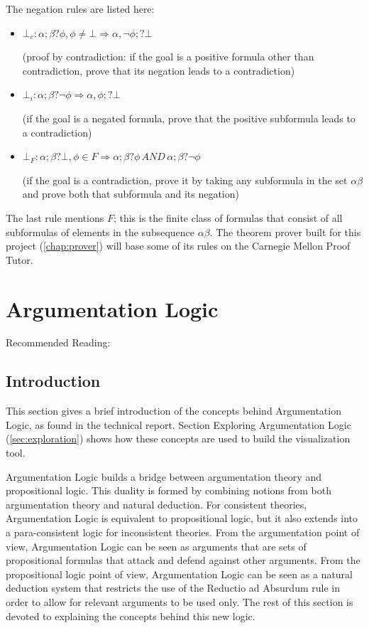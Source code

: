 \documentclass[11pt,twoside,a4paper]{report}
\begin{document}
The negation rules are listed here:
\begin{itemize}
\item
$\bot_c: \alpha;\beta?\phi, \phi\neq\bot \Rightarrow \alpha,\neg\phi;?\bot$

(proof by contradiction: if the goal is a positive formula other than contradiction, prove that its negation leads to a contradiction)
\item
$\bot_i: \alpha;\beta?\neg\phi \Rightarrow \alpha,\phi;?\bot$

(if the goal is a negated formula, prove that the positive subformula leads to a contradiction)
\item
$\bot_F: \alpha;\beta?\bot, \phi\in F \Rightarrow \alpha;\beta?\phi\, AND\, \alpha;\beta?\neg\phi$

(if the goal is a contradiction, prove it by taking any subformula in the set $\alpha\beta$ and prove both that subformula and its negation)
\end{itemize}

The last rule mentions $F$; this is the finite class of formulas that consist of all subformulas of elements in the subsequence $\alpha\beta$. The theorem prover built for this project (\autoref{chap:prover}) will base some of its rules on the Carnegie Mellon Proof Tutor.

\section{Argumentation Logic}
Recommended Reading: \citep*{alpaper}

\subsection{Introduction}
This section gives a brief introduction of the concepts behind Argumentation Logic, as found in the technical report. Section Exploring Argumentation Logic (\autoref{sec:exploration}) shows how these concepts are used to build the visualization tool.

Argumentation Logic builds a bridge between argumentation theory and propositional logic. This duality is formed by combining notions from both argumentation theory and natural deduction. For consistent theories, Argumentation Logic is equivalent to propositional logic, but it also extends into a para-consistent logic for inconsistent theories. From the argumentation point of view, Argumentation Logic can be seen as arguments that are sets of propositional formulas that attack and defend against other arguments. From the propositional logic point of view, Argumentation Logic can be seen as a natural deduction system that restricts the use of the Reductio ad Absurdum rule in order to allow for relevant arguments to be used only. The rest of this section is devoted to explaining the concepts behind this new logic.
\end{document}
